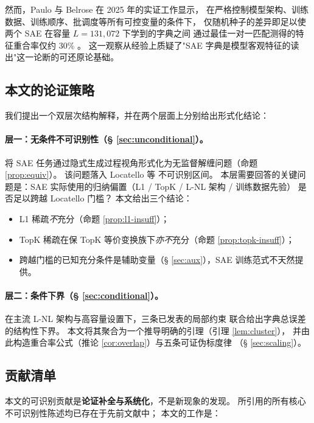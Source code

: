 \documentclass[11pt,a4paper]{article}
\theoremstyle{remark}
\begin{document}
然而，Paulo 与 Belrose 在 2025 年的实证工作显示，
在严格控制模型架构、训练数据、训练顺序、批调度等所有可控变量的条件下，
仅随机种子的差异即足以使两个 SAE 在容量 $L = 131{,}072$ 下学到的字典之间
通过最佳一对一匹配测得的特征重合率仅约 30\% \cite{paulo2025}。
这一观察从经验上质疑了"SAE 字典是模型客观特征的读出"这一论断的可还原论基础。

\subsection{本文的论证策略}

我们提出一个双层次结构解释，并在两个层面上分别给出形式化结论：

\paragraph{层一：无条件不可识别性（§ \ref{sec:unconditional}）。}
将 SAE 任务通过隐式生成过程视角形式化为无监督解缠问题（命题 \ref{prop:equiv}）。
该问题落入 Locatello 等 \cite{locatello2019} 不可识别区间。
本层需要回答的关键问题是：SAE 实际使用的归纳偏置（L1 / TopK / L-NL 架构 / 训练数据先验）
是否足以跨越 Locatello 门槛？
本文给出三个结论：
\begin{itemize}[leftmargin=*,itemsep=2pt]
\item L1 稀疏\emph{不}充分（命题 \ref{prop:l1-insuff}）；
\item TopK 稀疏在保 TopK 等价变换族下\emph{亦不}充分（命题 \ref{prop:topk-insuff}）；
\item 跨越门槛的已知充分条件是辅助变量（§ \ref{sec:aux}），SAE 训练范式不天然提供。
\end{itemize}

\paragraph{层二：条件下界（§ \ref{sec:conditional}）。}
在主流 L-NL 架构与高容量设置下，三条已发表的局部约束
\cite{oneill2024,cui2026,bhalla2026} 联合给出字典总误差的结构性下界。
本文将其聚合为一个推导明确的引理（引理 \ref{lem:cluster}），
并由此构造重合率公式（推论 \ref{cor:overlap}）与五条可证伪标度律
（§ \ref{sec:scaling}）。

\subsection{贡献清单}

本文的可识别贡献是\textbf{论证补全与系统化}，不是新现象的发现。
所引用的所有核心不可识别性陈述均已存在于先前文献中；
本文的工作是：
\end{document}
